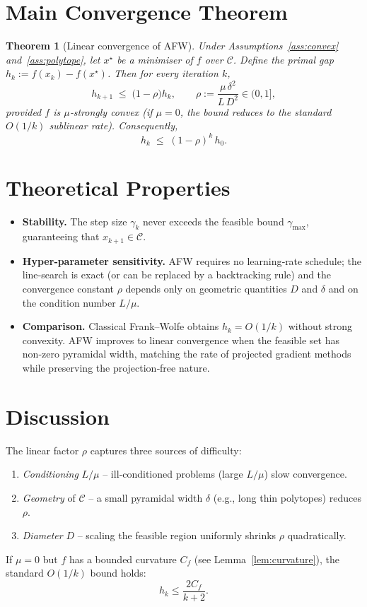 \documentclass{article}
\newtheorem{theorem}{Theorem}
\begin{document}
\section*{Main Convergence Theorem}
\begin{theorem}[Linear convergence of AFW]\label{thm:linear}
Under Assumptions~\ref{ass:convex} and~\ref{ass:polytope}, let $x^\star$ be a minimiser of $f$ over $\mathcal{C}$. Define the primal gap $h_k:=f(x_k)-f(x^\star)$. Then for every iteration $k$,
\[
h_{k+1}\;\le\;\bigl(1-\rho\bigr)h_k,\qquad 
\rho:=\frac{\mu\,\delta^2}{L\,D^2}\in(0,1],
\]
provided $f$ is $\mu$‑strongly convex (if $\mu=0$, the bound reduces to the standard $O(1/k)$ sublinear rate). Consequently,
\[
h_k\;\le\;(1-\rho)^k\,h_0 .
\]
\end{theorem}

\section*{Theoretical Properties}
\begin{itemize}
    \item \textbf{Stability.} The step size $\gamma_k$ never exceeds the feasible bound $\gamma_{\max}$, guaranteeing that $x_{k+1}\in\mathcal{C}$.
    \item \textbf{Hyper‑parameter sensitivity.} AFW requires no learning‑rate schedule; the line‑search is exact (or can be replaced by a backtracking rule) and the convergence constant $\rho$ depends only on geometric quantities $D$ and $\delta$ and on the condition number $L/\mu$.
    \item \textbf{Comparison.} Classical Frank–Wolfe obtains $h_k=O(1/k)$ without strong convexity. AFW improves to linear convergence when the feasible set has non‑zero pyramidal width, matching the rate of projected gradient methods while preserving the projection‑free nature.
\end{itemize}

\section*{Discussion}
The linear factor $\rho$ captures three sources of difficulty:
\begin{enumerate}
    \item \emph{Conditioning} $L/\mu$ – ill‑conditioned problems (large $L/\mu$) slow convergence.
    \item \emph{Geometry} of $\mathcal{C}$ – a small pyramidal width $\delta$ (e.g., long thin polytopes) reduces $\rho$.
    \item \emph{Diameter} $D$ – scaling the feasible region uniformly shrinks $\rho$ quadratically.
\end{enumerate}
If $\mu=0$ but $f$ has a bounded curvature $C_f$ (see Lemma~\ref{lem:curvature}), the standard $O(1/k)$ bound holds:
\[
h_k\le \frac{2C_f}{k+2}.
\]
\end{document}
